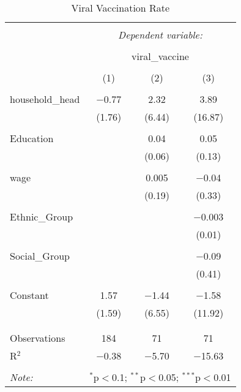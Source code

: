 \documentclass{article}
\begin{document}
\begin{table}[!htbp] \centering 
  \caption{Viral Vaccination Rate} 
  \label{} 
\begin{tabular}{@{\extracolsep{5pt}}lccc} 
\\[-1.8ex]\hline 
\hline \\[-1.8ex] 
 & \multicolumn{3}{c}{\textit{Dependent variable:}} \\ 
\cline{2-4} 
\\[-1.8ex] & \multicolumn{3}{c}{viral\_vaccine} \\ 
\\[-1.8ex] & (1) & (2) & (3)\\ 
\hline \\[-1.8ex] 
 household\_head & $-$0.77 & 2.32 & 3.89 \\ 
  & (1.76) & (6.44) & (16.87) \\ 
  & & & \\ 
 Education &  & 0.04 & 0.05 \\ 
  &  & (0.06) & (0.13) \\ 
  & & & \\ 
 wage &  & 0.005 & $-$0.04 \\ 
  &  & (0.19) & (0.33) \\ 
  & & & \\ 
 Ethnic\_Group &  &  & $-$0.003 \\ 
  &  &  & (0.01) \\ 
  & & & \\ 
   Social\_Group &  &  & $-$0.09 \\ 
  &  &  & (0.41) \\ 
  & & & \\ 
 Constant & 1.57 & $-$1.44 & $-$1.58 \\ 
  & (1.59) & (6.55) & (11.92) \\ 
  & & & \\ 
\hline \\[-1.8ex] 
Observations & 184 & 71 & 71 \\ 
R$^{2}$ & $-$0.38 & $-$5.70 & $-$15.63 \\ 
\hline 
\hline \\[-1.8ex] 
\textit{Note:}  & \multicolumn{3}{r}{$^{*}$p$<$0.1; $^{**}$p$<$0.05; $^{***}$p$<$0.01} \\ 
\end{tabular} 
\end{table} 
\end{document}
